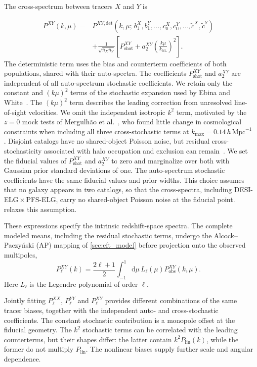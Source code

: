 \documentclass[a4paper,11pt]{article}
\newcommand{\revchange}[1]{{\color{RevisionColor}#1}}
\def\be{\begin{equation}}
\def\ee{\end{equation}}
\def\knl{k_{\mathrm{NL}}}
\def\iMpch{\,h\,\mathrm{Mpc}^{-1}}
\newcommand{\dd}{\mathrm{d}}
\newcommand{\ctilde}{\tilde{c}}
\newcommand{\Pshot}{P_{\mathrm{shot}}}
\newcommand{\nbar}{\bar{n}}
\begin{document}
The cross-spectrum between tracers $X$ and $Y$ is
\revchange{\be
\label{eqn:cross}
\begin{aligned}
P^{XY}(k,\mu)
={}&P^{XY,\mathrm{det}}(k,\mu;\,b_1^X,b_1^Y,\ldots,c_0^X,c_0^Y,\ldots,\ctilde^X,\ctilde^Y)\\
&+\frac{1}{\sqrt{\nbar_X\nbar_Y}}\left[\Pshot^{XY}
+a_2^{XY}\left(\frac{k\mu}{\knl}\right)^2\right].
\end{aligned}
\ee
The deterministic term uses the bias and counterterm coefficients of
both populations, shared with their auto-spectra.
The coefficients $\Pshot^{XY}$ and $a_2^{XY}$ are independent
of all auto-spectrum stochastic coefficients. We retain only the
constant and $(k\mu)^2$ terms of the stochastic expansion used by
Ebina and White~\cite{Ebina:2024ojt}. The $(k\mu)^2$ term describes
the leading correction from unresolved line-of-sight velocities.
We omit the independent isotropic $k^2$ term, motivated by the
$z=0$ mock tests of Mergulh\~ao et al.~\cite{Mergulhao:2023zso},
who found little change in cosmological constraints when including
all three cross-stochastic terms at $k_{\mathrm{max}}=0.14\iMpch$.
Disjoint catalogs have no shared-object Poisson noise, but residual
cross-stochasticity associated with halo occupation and exclusion
can remain~\cite{Mergulhao:2023zso}.
We set the fiducial values of $\Pshot^{XY}$ and $a_2^{XY}$
to zero and marginalize over both with Gaussian prior standard
deviations of one. The auto-spectrum stochastic coefficients have
the same fiducial values and prior widths.
This choice assumes that no galaxy appears in two catalogs, so that the
cross-spectra, including DESI-ELG\,$\times$\,PFS-ELG, carry no shared-object
Poisson noise at the fiducial point. \Cref{sec:results_sensitivity} relaxes
this assumption.

These expressions specify the intrinsic redshift-space spectra. The complete
modeled means, including the residual stochastic terms, undergo the
Alcock--Paczy\'nski (AP) mapping of \cref{sec:eft_model} before projection onto the observed
multipoles,
\[
P_\ell^{XY}(k)=\frac{2\ell+1}{2}
\int_{-1}^{1}\!\dd\mu\,L_\ell(\mu)P_{\mathrm{obs}}^{XY}(k,\mu).
\]
Here $L_\ell$ is the Legendre polynomial of order $\ell$.}

\revchange{Jointly fitting $P_\ell^{XX}$, $P_\ell^{YY}$ and
$P_\ell^{XY}$ provides different combinations of the same tracer
biases, together with the independent auto- and cross-stochastic
coefficients. The constant stochastic contribution is a monopole
offset at the fiducial geometry. The $k^2$ stochastic terms can be
correlated with the leading counterterms, but their shapes differ:
the latter contain $k^2P_{\mathrm{lin}}(k)$, while the former do not
multiply $P_{\mathrm{lin}}$. The nonlinear biases supply further
scale and angular dependence.}
\end{document}
